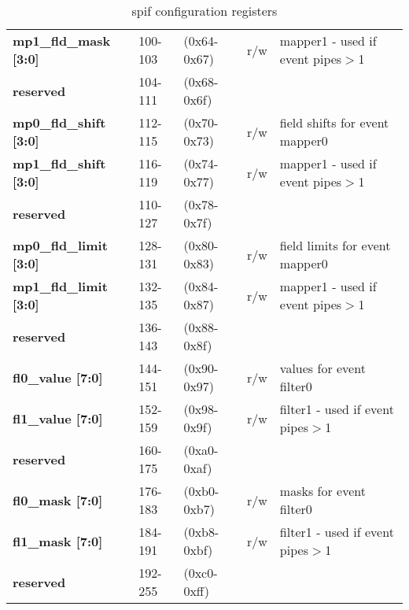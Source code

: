 \documentclass[11pt,a4paper,twoside]{article}
\begin{document}
\begin{center}
\begin{table}[!h]
\begin{tabularx}{\textwidth}{| p{37mm} p{13mm} p{21mm} p{6mm} X |}
		\textbf{mp1\_fld\_mask [3:0]}        & 100-103                    & (0x64-0x67)                    & r/w                 & mapper1 - used if event pipes$>$1 \\%
		\cellcolor{gray!25}\textbf{reserved} & \cellcolor{gray!25}104-111 & \cellcolor{gray!25}(0x68-0x6f) & \cellcolor{gray!25} & \cellcolor{gray!25}\\%
		\textbf{mp0\_fld\_shift [3:0]}       & 112-115                    & (0x70-0x73)                    & r/w                 & field shifts for event mapper0  \\%
		\textbf{mp1\_fld\_shift [3:0]}       & 116-119                    & (0x74-0x77)                    & r/w                 & mapper1 - used if event pipes$>$1  \\%
		\cellcolor{gray!25}\textbf{reserved} & \cellcolor{gray!25}110-127 & \cellcolor{gray!25}(0x78-0x7f) & \cellcolor{gray!25} & \cellcolor{gray!25}\\%
		\textbf{mp0\_fld\_limit [3:0]}       & 128-131                    & (0x80-0x83)                    & r/w                 & field limits for event mapper0  \\%
		\textbf{mp1\_fld\_limit [3:0]}       & 132-135                    & (0x84-0x87)                    & r/w                 & mapper1 - used if event pipes$>$1  \\%
		\cellcolor{gray!25}\textbf{reserved} & \cellcolor{gray!25}136-143 & \cellcolor{gray!25}(0x88-0x8f) & \cellcolor{gray!25} & \cellcolor{gray!25}\\%
		\textbf{fl0\_value [7:0]}            & 144-151                    & (0x90-0x97)                    & r/w                 & values for event filter0  \\%
		\textbf{fl1\_value [7:0]}            & 152-159                    & (0x98-0x9f)                    & r/w                 & filter1 - used if event pipes$>$1  \\%
		\cellcolor{gray!25}\textbf{reserved} & \cellcolor{gray!25}160-175 & \cellcolor{gray!25}(0xa0-0xaf) & \cellcolor{gray!25} & \cellcolor{gray!25}\\%
		\textbf{fl0\_mask [7:0]}             & 176-183                    & (0xb0-0xb7)                    & r/w                 & masks for event filter0  \\%
		\textbf{fl1\_mask [7:0]}             & 184-191                    & (0xb8-0xbf)                    & r/w                 & filter1 - used if event pipes$>$1  \\%
		\cellcolor{gray!25}\textbf{reserved} & \cellcolor{gray!25}192-255 & \cellcolor{gray!25}(0xc0-0xff) & \cellcolor{gray!25} & \cellcolor{gray!25}\\%
		\hline
	\end{tabularx}
	\caption{spif configuration registers}
	\label{tab:spif_regs}
\end{table}
\end{center}
\end{document}
